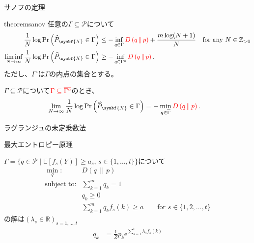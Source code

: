 \documentclass[lualatex,handout]{beamer}
\newcommand{\mycolor}[2]{%
  \begingroup
  \colorlet{currentcolor}{.}%
  \color{#1}#2%
  \color{currentcolor}%
  \endgroup
}
\newcommand{\emm}[1]{\mycolor{red}{#1}}
\newcommand{\expt}[1]{\mathbb{E}\left[#1\right]}
\newcommand\KL[2]{D\left(#1\,\|\,#2\right)}
\theoremstyle{definition}
\begin{document}
\begin{frame}{サノフの定理}
\begin{restatable}[サノフの定理]{theorem}{sanov}
\footnotesize
任意の$\Gamma\subseteq\mathcal{P}$について
\begin{align*}
\frac1N\log\Pr\left(\widehat{P}_{\symbf{X}} \in \Gamma\right) &\le -\inf_{q\in \Gamma} \emm{\KL{q}{p}} + \frac{m\log(N+1)}N\quad\text{for any $N\in\mathbb{Z}_{>0}$}\\
\liminf_{N\to\infty}\frac1N\log \Pr\left(\widehat{P}_{\symbf{X}} \in \Gamma\right) &\ge -\inf_{q\in \Gamma^\circ} \emm{\KL{q}{p}}.
\end{align*}
ただし、$\Gamma^\circ$は$\Gamma$の内点の集合とする。
\end{restatable}
\begin{corollary}
\footnotesize
$\Gamma\subseteq\mathcal{P}$について$\emm{\Gamma\subseteq\overline{\Gamma^\circ}}$のとき、
\begin{align*}
\lim_{N\to\infty}\frac1N\log \Pr\left(\widehat{P}_{\symbf{X}} \in \Gamma\right) &= -\min_{q\in \overline{\Gamma}} \emm{\KL{q}{p}}.
\end{align*}
\end{corollary}
\end{frame}

\begin{frame}{ラグランジュの未定乗数法}
\end{frame}

\begin{frame}{最大エントロピー原理}
\begin{theorem}
$\Gamma=\{q\in\mathcal{P}\mid \expt{f_s(Y)}\ge a_s,\, s\in\{1,\dotsc,t\}\}$について
\begin{align*}
\min_{q}\colon& \KL{q}{p}\\
\text{subject to}\colon& \sum_{k=1}^m q_k = 1\\
&q_k\ge 0\\
&\sum_{k=1}^m q_k f_s(k) \ge a\qquad \text{for } s\in\{1,2,\dotsc,t\} 
\end{align*}
の解は$(\lambda_s\in\mathbb{R})_{s=1,\dotsc,t}$
\begin{align*}
q_k &= \frac1Z p_k\mathrm{e}^{\sum_{s=1}^t \lambda_s f_s(k)}
\end{align*}
\end{theorem}
\end{frame}
\end{document}
